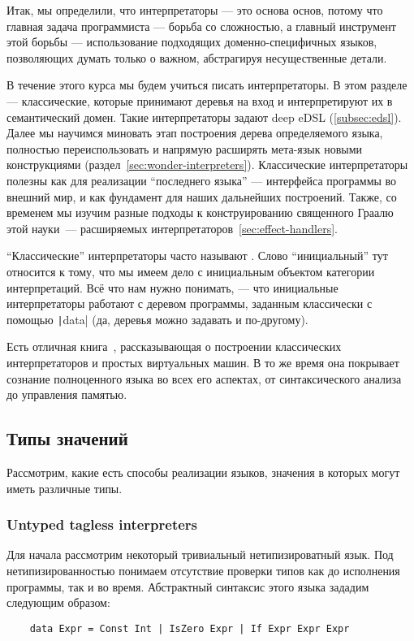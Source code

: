 
Итак, мы определили, что интерпретаторы --- это основа основ, потому что главная задача программиста --- борьба со сложностью, а главный инструмент этой борьбы --- использование подходящих доменно-специфичных языков, позволяющих думать только о важном, абстрагируя несущественные детали.

В течение этого курса мы будем учиться писать интерпретаторы.
В этом разделе --- классические, которые принимают деревья на вход и интерпретируют их в семантический домен.
Такие интерпретаторы задают deep eDSL (\ref{subsec:edsl}).
Далее мы научимся миновать этап построения дерева определяемого языка, полностью переиспользовать и напрямую расширять мета-язык новыми конструкциями (раздел~\ref{sec:wonder-interpreters}).
Классические интерпретаторы полезны как для реализации ``последнего языка'' --- интерфейса программы во внешний мир, и как фундамент для наших дальнейших построений.
Также, со временем мы изучим разные подходы к конструированию священного Граалю этой науки~--- расширяемых интерпретаторов~\ref{sec:effect-handlers}.

``Классические'' интерпретаторы часто называют .
Слово ``инициальный'' тут относится к тому, что мы имеем дело с инициальным объектом категории интерпретаций.
Всё что нам нужно понимать, --- что инициальные интерпретаторы работают с деревом программы, заданным классически с помощью \texttt|data| (да, деревья можно задавать и по-другому).

Есть отличная книга~\cite{nystrom2021crafting}, рассказывающая о построении классических интерпретаторов и простых виртуальных машин.
В то же время она покрывает сознание полноценного языка во всех его аспектах, от синтаксического анализа до управления памятью.

\subsection{Типы значений}

Рассмотрим, какие есть способы реализации языков, значения в которых могут иметь различные типы.

\subsubsection{Untyped tagless interpreters}

Для начала рассмотрим некоторый тривиальный нетипизироватный язык.
Под нетипизированностью понимаем отсутствие проверки типов как до исполнения программы, так и во время.
Абстрактный синтаксис этого языка зададим следующим образом:
\begin{verbatim}
    data Expr = Const Int | IsZero Expr | If Expr Expr Expr
\end{verbatim}

